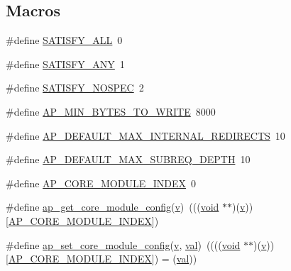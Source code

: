 \subsection*{Macros}
\begin{DoxyCompactItemize}
\item 
\#define \hyperlink{group__APACHE__CORE__HTTPD_gacc2b7ed25e2401cac2190b7d65ae3a41}{S\+A\+T\+I\+S\+F\+Y\+\_\+\+A\+LL}~0
\item 
\#define \hyperlink{group__APACHE__CORE__HTTPD_ga1b48167fdd55bd64a0fa79800847ce84}{S\+A\+T\+I\+S\+F\+Y\+\_\+\+A\+NY}~1
\item 
\#define \hyperlink{group__APACHE__CORE__HTTPD_gab684a5ab63ca78970814c6f9ad2fc239}{S\+A\+T\+I\+S\+F\+Y\+\_\+\+N\+O\+S\+P\+EC}~2
\item 
\#define \hyperlink{group__APACHE__CORE__HTTPD_ga3748bf0c3d0473c650494d68507c9065}{A\+P\+\_\+\+M\+I\+N\+\_\+\+B\+Y\+T\+E\+S\+\_\+\+T\+O\+\_\+\+W\+R\+I\+TE}~8000
\item 
\#define \hyperlink{group__APACHE__CORE__HTTPD_ga3f3117748d84adaa218cb8cb6772a3ae}{A\+P\+\_\+\+D\+E\+F\+A\+U\+L\+T\+\_\+\+M\+A\+X\+\_\+\+I\+N\+T\+E\+R\+N\+A\+L\+\_\+\+R\+E\+D\+I\+R\+E\+C\+TS}~10
\item 
\#define \hyperlink{group__APACHE__CORE__HTTPD_ga80a0679eebb84abcc5de23d8558a2eca}{A\+P\+\_\+\+D\+E\+F\+A\+U\+L\+T\+\_\+\+M\+A\+X\+\_\+\+S\+U\+B\+R\+E\+Q\+\_\+\+D\+E\+P\+TH}~10
\item 
\#define \hyperlink{group__APACHE__CORE__HTTPD_gaf1cdaac5f4562d9d20bae417471ad422}{A\+P\+\_\+\+C\+O\+R\+E\+\_\+\+M\+O\+D\+U\+L\+E\+\_\+\+I\+N\+D\+EX}~0
\item 
\#define \hyperlink{group__APACHE__CORE__HTTPD_ga5e96e185d9e95051576a4fbb7846ae51}{ap\+\_\+get\+\_\+core\+\_\+module\+\_\+config}(\hyperlink{pcregrep_8txt_aeed5af99df1c3051bb73049f9d549819}{v})~(((\hyperlink{group__MOD__ISAPI_gacd6cdbf73df3d9eed42fa493d9b621a6}{void} $\ast$$\ast$)(\hyperlink{pcregrep_8txt_aeed5af99df1c3051bb73049f9d549819}{v}))\mbox{[}\hyperlink{group__APACHE__CORE__HTTPD_gaf1cdaac5f4562d9d20bae417471ad422}{A\+P\+\_\+\+C\+O\+R\+E\+\_\+\+M\+O\+D\+U\+L\+E\+\_\+\+I\+N\+D\+EX}\mbox{]})
\item 
\#define \hyperlink{group__APACHE__CORE__HTTPD_gaf58604124c85c067bf69e9b302fd46a7}{ap\+\_\+set\+\_\+core\+\_\+module\+\_\+config}(\hyperlink{pcregrep_8txt_aeed5af99df1c3051bb73049f9d549819}{v},  \hyperlink{group__apr__tables_ga4d708cd93abeca73400ed82977502830}{val})~((((\hyperlink{group__MOD__ISAPI_gacd6cdbf73df3d9eed42fa493d9b621a6}{void} $\ast$$\ast$)(\hyperlink{pcregrep_8txt_aeed5af99df1c3051bb73049f9d549819}{v}))\mbox{[}\hyperlink{group__APACHE__CORE__HTTPD_gaf1cdaac5f4562d9d20bae417471ad422}{A\+P\+\_\+\+C\+O\+R\+E\+\_\+\+M\+O\+D\+U\+L\+E\+\_\+\+I\+N\+D\+EX}\mbox{]}) = (\hyperlink{group__apr__tables_ga4d708cd93abeca73400ed82977502830}{val}))

\end{DoxyCompactItemize}
